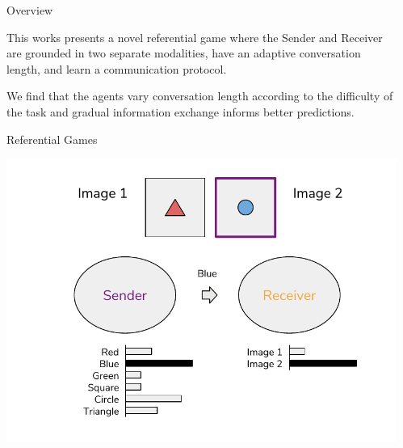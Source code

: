 \documentclass[final]{beamer}
\newlength{\sepwid}
\newlength{\onecolwid}
\begin{document}
\begin{frame}[t] %

\begin{columns}[t] %

\begin{column}{\sepwid}\end{column} %

\begin{column}{\onecolwid} %


\begin{block}{Overview}

This works presents a novel referential game where the Sender and Receiver are grounded in two separate modalities, have an adaptive conversation length, and learn a communication protocol.

\vspace{5mm}

We find that the agents vary conversation length according to the difficulty of the task and gradual information exchange informs better predictions.

\end{block}

\vspace{5mm}

\begin{block}{Referential Games}

\vspace{-15mm}

\begin{center}
\includegraphics[width=0.8\linewidth]{figures/ref_game_lazaridou.pdf}
\end{center}


\end{block}
\end{column}
\end{columns}
\end{frame}
\end{document}
